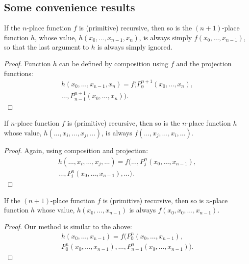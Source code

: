 \documentclass[12pt]{report}
\theoremstyle{nonumberplain}
\newtheorem{proof}{Proof}
\begin{document}
\subsection*{Some convenience results}

\begin{mt}
If the $n$-place function $f$ is (primitive) recursive, then so is the $(n+1)$-place function $h$, whose value, $h(x_0, \dotsc, x_{n-1}, x_{n})$, is always simply $f(x_0, \dotsc, x_{n-1})$, so that the last argument to $h$ is always simply ignored.\\
\end{mt}

\begin{proof}
Function $h$ can be defined by composition using $f$ and the projection functions:
\begin{multline*}
h(x_0, \dotsc, x_{n-1}, x_{n}) = f(P^{n+1}_0(x_0, \dotsc, x_{n}), \\ \dotsc, P^{n+1}_{n-1}(x_0, \dotsc, x_{n})).
\end{multline*}
\end{proof}

\begin{mt}
If $n$-place function $f$ is (primitive) recursive, then so is the $n$-place function $h$ whose value, $h(\dotsc, x_i, \dotsc, x_j, \dotsc)$, is always $f(\dotsc, x_j, \dotsc, x_i, \dotsc)$.
\end{mt}
\begin{proof}
Again, using composition and projection:
\begin{multline*}
h(\dotsc, x_i, \dotsc, x_j, \dotsc) = f(\dotsc, P^n_j(x_0, \dotsc, x_{n-1}), \\ \dotsc, P^n_i(x_0, \dotsc, x_{n-1}), \dotsc).
\end{multline*}
\end{proof}

\begin{mt}
If the $(n+1)$-place function $f$ is (primitive) recursive, then
so is $n$-place function $h$ whose value, $h(x_0, \dotsc, x_{n-1})$ is always $f(x_0, x_0, \dotsc, x_{n-1})$.
\end{mt}
\begin{proof}
Our method is similar to the above:
\begin{multline*}
h(x_0, \dotsc, x_{n-1}) = f(P^n_0(x_0, \dotsc, x_{n-1}), \\ P^n_0(x_0, \dotsc, x_{n-1}), \dotsc, P^n_{n-1}(x_0, \dotsc, x_{n-1})).
\end{multline*}
\end{proof}
\end{document}
